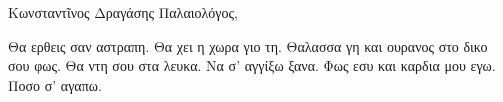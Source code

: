 \documentclass[a4paper,11pt]{article}
\begin{document}
\rmfamily




Κωνσταντῖνος Δραγάσης Παλαιολόγος,
\vspace{1em}


\lipsum[1]

\lipsum[2]

Θα ερθεις σαν αστραπη. Θα χει η χωρα γιο τη. Θαλασσα γη και ουρανος στο δικο σου φως.
Θα ντη σου στα λευκα. Να σ' αγγίξω ξανα. Φως εσυ και καρδια μου εγω. Ποσο σ' αγαπω.


\end{document}
